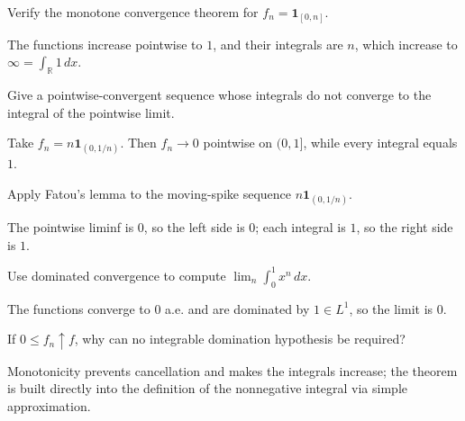 \begin{problem}\label{prob:iii04-problem-01}
Verify the monotone convergence theorem for \(f_n=\mathbf1_{[0,n]}\).
\end{problem}
\begin{solution}
The functions increase pointwise to \(1\), and their integrals are \(n\),
which increase to \(\infty=\int_{\mathbb R}1\,dx\).
\end{solution}

\begin{problem}\label{prob:iii04-problem-02}
Give a pointwise-convergent sequence whose integrals do not converge to the integral of the pointwise limit.
\end{problem}
\begin{solution}
Take \(f_n=n\mathbf1_{(0,1/n)}\). Then \(f_n\to0\) pointwise on \((0,1]\),
while every integral equals \(1\).
\end{solution}

\begin{problem}\label{prob:iii04-problem-03}
Apply Fatou's lemma to the moving-spike sequence \(n\mathbf1_{(0,1/n)}\).
\end{problem}
\begin{solution}
The pointwise liminf is \(0\), so the left side is \(0\); each integral is
\(1\), so the right side is \(1\).
\end{solution}

\begin{problem}\label{prob:iii04-problem-04}
Use dominated convergence to compute \(\lim_n\int_0^1x^n\,dx\).
\end{problem}
\begin{solution}
The functions converge to \(0\) a.e. and are dominated by \(1\in L^1\), so
the limit is \(0\).
\end{solution}

\begin{problem}\label{prob:iii04-problem-05}
If \(0\le f_n\uparrow f\), why can no integrable domination hypothesis be required?
\end{problem}
\begin{solution}
Monotonicity prevents cancellation and makes the integrals increase; the
theorem is built directly into the definition of the nonnegative integral via
simple approximation.
\end{solution}

